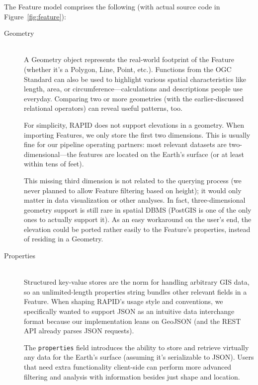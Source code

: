 The Feature model comprises the following (with actual source code in Figure~\ref{fig:feature}):

\begin{description}
  \item[Geometry] \hfill \\
  A Geometry object represents the real-world footprint of the Feature (whether it's a Polygon, Line, Point, etc.). Functions from the OGC Standard can also be used to highlight various spatial characteristics like length, area, or circumference---calculations and descriptions people use everyday. Comparing two or more geometries (with the earlier-discussed relational operators) can reveal useful patterns, too.
   
   For simplicity, RAPID does not support elevations in a geometry. When importing Features, we only store the first two dimensions. This is usually fine for our pipeline operating partners: most relevant datasets are two-dimensional---the features are located on the Earth's surface (or at least within tens of feet).
   
   This missing third dimension is not related to the querying process (we never planned to allow Feature filtering based on height); it would only matter in data visualization or other analyses. In fact, three-dimensional geometry support is still rare in spatial DBMS (PostGIS is one of the only ones to actually support it). As an easy workaround on the user's end, the elevation could be ported rather easily to the Feature's properties, instead of residing in a Geometry.
  
  \item[Properties] \hfill \\
  Structured key-value stores are the norm for handling arbitrary GIS data, so an unlimited-length properties string bundles other relevant fields in a Feature. When shaping RAPID's usage style and conventions, we specifically wanted to support JSON as an intuitive data interchange format because our implementation leans on GeoJSON (and the REST API already parses JSON requests).
  
  The \texttt{properties} field introduces the ability to store and retrieve virtually any data for the Earth's surface (assuming it's serializable to JSON). Users that need extra functionality client-side can perform more advanced filtering and analysis with information besides just shape and location.
  

\end{description}
